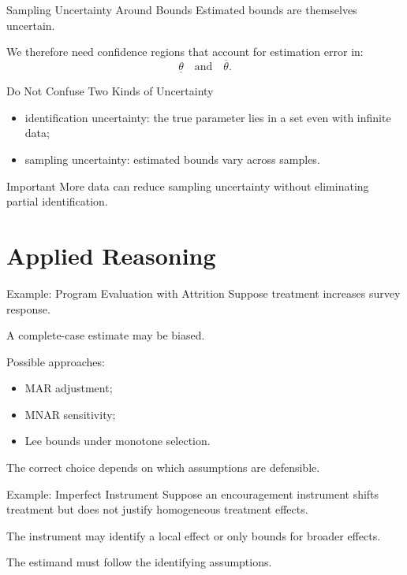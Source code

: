 \documentclass[aspectratio=169,11pt]{beamer}
\begin{document}
\begin{frame}{Sampling Uncertainty Around Bounds}
Estimated bounds are themselves uncertain.

We therefore need confidence regions that account for estimation error in:
\[
\underline{\theta}
\quad\text{and}\quad
\overline{\theta}.
\]
\end{frame}

\begin{frame}{Do Not Confuse Two Kinds of Uncertainty}
\begin{itemize}
\item identification uncertainty: the true parameter lies in a set even with infinite data;
\item sampling uncertainty: estimated bounds vary across samples.
\end{itemize}

\begin{alertblock}{Important}
More data can reduce sampling uncertainty without eliminating partial identification.
\end{alertblock}
\end{frame}

\section{Applied Reasoning}

\begin{frame}{Example: Program Evaluation with Attrition}
Suppose treatment increases survey response.

A complete-case estimate may be biased.

Possible approaches:
\begin{itemize}
\item MAR adjustment;
\item MNAR sensitivity;
\item Lee bounds under monotone selection.
\end{itemize}

The correct choice depends on which assumptions are defensible.
\end{frame}

\begin{frame}{Example: Imperfect Instrument}
Suppose an encouragement instrument shifts treatment but does not justify homogeneous treatment effects.

The instrument may identify a local effect or only bounds for broader effects.

The estimand must follow the identifying assumptions.
\end{frame}
\end{document}

